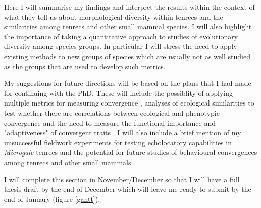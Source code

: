 \documentclass[12pt,a4paper]{article}
\begin{document}
	Here I will summarise my findings and interpret the results within the context of what they tell us about morphological diversity within tenrecs and the similarities among tenrecs and other small mammal species. I will also highlight the importance of taking a quantitative approach to studies of evolutionary diversity among species groups. In particular I will stress the need to apply existing methods to new groups of species which are usually not as well studied as the groups that are used to develop such metrics. %
	

	My suggestions for future directions will be based on the plans that I had made for continuing with the PhD. These will include the possiblity of applying multiple metrics for measuring convergence \citep[e.g.][]{Ingram2013, Segar2013, Harmon2005}, analyses of ecological similarities to test whether there are correlations between ecological and phenotypic convergence \citep[e.g.][]{Moen2013} and the need to measure the functional importance and "adaptiveness" of convergent traits \citep{Losos2010}. I will also include a brief mention of my unsuccessful fieldwork experiments for testing echolocatory capabilities in \textit{Microgale} tenrecs and the potential for future studies of behavioural convergences among tenrecs and other small mammals.


	I will complete this section in November/December so that I will have a full thesis draft by the end of December which will leave me ready to submit by the end of January (figure \ref{gantt}).


	


	
\end{document}
